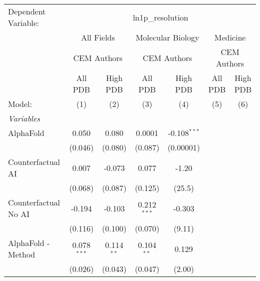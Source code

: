 \begingroup
\centering
\begin{tabular}{lcccccc}
   \tabularnewline \midrule \midrule
   Dependent Variable: & \multicolumn{6}{c}{ln1p\_resolution}\\
 & \multicolumn{2}{c}{All Fields} & \multicolumn{2}{c}{Molecular Biology} & \multicolumn{2}{c}{Medicine} \\
\cmidrule(lr){2-3} \cmidrule(lr){4-5} \cmidrule(lr){6-7}
 & \multicolumn{2}{c}{CEM Authors} & \multicolumn{2}{c}{CEM Authors} & \multicolumn{2}{c}{CEM Authors} \\
\cmidrule(lr){2-3} \cmidrule(lr){4-5} \cmidrule(lr){6-7}
 & \multicolumn{1}{c}{All PDB} & \multicolumn{1}{c}{High PDB} & \multicolumn{1}{c}{All PDB} & \multicolumn{1}{c}{High PDB} & \multicolumn{1}{c}{All PDB} & \multicolumn{1}{c}{High PDB} \\
\cmidrule(lr){2-2} \cmidrule(lr){3-3} \cmidrule(lr){4-4} \cmidrule(lr){5-5} \cmidrule(lr){6-6} \cmidrule(lr){7-7}
   Model:                                                     & (1)            & (2)          & (3)           & (4)            & (5) & (6)\\  
   \midrule
   \emph{Variables}\\
   AlphaFold                                                  & 0.050          & 0.080        & 0.0001        & -0.108$^{***}$ &     &   \\   
                                                              & (0.046)        & (0.080)      & (0.087)       & (0.00001)      &     &   \\   
   Counterfactual AI                                          & 0.007          & -0.073       & 0.077         & -1.20          &     &   \\   
                                                              & (0.068)        & (0.087)      & (0.125)       & (25.5)         &     &   \\   
   Counterfactual No AI                                       & -0.194         & -0.103       & 0.212$^{***}$ & -0.303         &     &   \\   
                                                              & (0.116)        & (0.100)      & (0.070)       & (9.11)         &     &   \\   
   AlphaFold - Method                                         & 0.078$^{***}$  & 0.114$^{**}$ & 0.104$^{**}$  & 0.129          &     &   \\   
                                                              & (0.026)        & (0.043)      & (0.047)       & (2.00)         &     &   \\   

\end{tabular}
